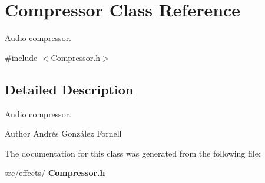 \section{Compressor Class Reference}
\label{class_compressor}


Audio compressor.  




{\ttfamily \#include $<$Compressor.\+h$>$}



\subsection{Detailed Description}
Audio compressor. 

\begin{DoxyAuthor}{Author}
Andrés González Fornell 
\end{DoxyAuthor}


The documentation for this class was generated from the following file\+:\begin{DoxyCompactItemize}
\item 
src/effects/\textbf{ Compressor.\+h}\end{DoxyCompactItemize}
